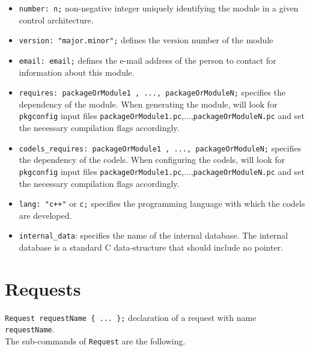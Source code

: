 \begin{itemize}
\item[]{\tt number:  n;} non-negative integer uniquely identifying the module in
a given control architecture.

\item[]\texttt{version:  "major.minor";} defines the version number of the 
module

\item[]\texttt{email:  email;} defines the e-mail address of
the person to contact for information about this module.

\item[]\texttt{requires:  packageOrModule1 , ..., packageOrModuleN;}
specifies the dependency of the module. When generating the module,
{\GenoM} will look for \texttt{pkgconfig} input files
\texttt{packageOrModule1.pc},...,\texttt{packageOrModuleN.pc} and set
the necessary compilation flags accordingly. 

\item[]\texttt{codels\_requires:  packageOrModule1 , ..., packageOrModuleN;}
specifies the dependency of the codels. When configuring the codels,
{\GenoM} will look for \texttt{pkgconfig} input files
\texttt{packageOrModule1.pc},...,\texttt{packageOrModuleN.pc} and set
the necessary compilation flags accordingly. 

\item[]\texttt{lang:  "c++"} or \texttt{c;} specifies the programming
language with which the codels are developed.

\item[]{\tt internal\_data}: specifies the name of the internal database.
The internal database is a standard C data-structure that should
include no pointer.
\end{itemize}

\section{Requests}
\label{sec|requests}

{\tt Request requestName \{ ... \};} declaration of a request with
name {\tt requestName}.\\

\noindent
The sub-commands of {\tt Request} are the following.\\

